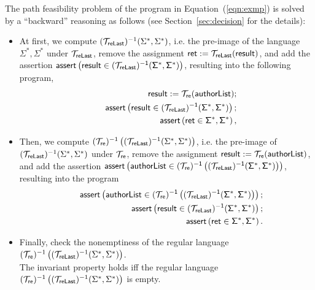 The path feasibility problem of the program in Equation~(\ref{eqn:exmp}) is solved by a ``backward'' reasoning as follows (see Section~\ref{sec:decision} for the details):  
\begin{itemize}
\item At first, we compute $(\mathcal{T}_{\sf reLast})^{-1}(\Sigma^*, \Sigma^*)$,  i.e. the pre-image of the language $\Sigma^*, \Sigma^*$ under $\mathcal{T}_{\sf reLast}$,  remove the assignment $\sf  ret : = \mathcal{T}_{reLast}(result)$, and add the assertion $\textsf{assert}\left(\sf result \in (\mathcal{T}_{\sf reLast})^{-1}(\Sigma^*, \Sigma^*)\right)$, resulting into the following program,
\begin{eqnarray}
& & \sf result  := \sf  \mathcal{T}_{ re}(authorList); \nonumber\\
& & \textsf{assert}\left(\sf result \in (\mathcal{T}_{\sf reLast})^{-1}(\Sigma^*, \Sigma^*)\right); \nonumber\\
& & \sf \textsf{assert}\left(ret \in \Sigma^*, \Sigma^*\right),
\end{eqnarray}

%
\item Then, we compute $(\mathcal{T}_{\sf re})^{-1}\left((\mathcal{T}_{\sf reLast})^{-1}(\Sigma^*, \Sigma^*)\right)$, i.e. the pre-image of $(\mathcal{T}_{\sf reLast})^{-1}(\Sigma^*, \Sigma^*)$ under $\mathcal{T}_{\sf re}$, remove the assignment $ \sf result  := \sf  \mathcal{T}_{ re}(authorList)$, and add the assertion $\textsf{assert}\left(\sf authorList \in (\mathcal{T}_{ re})^{-1}\left((\mathcal{T}_{\sf reLast})^{-1}(\Sigma^*, \Sigma^*)\right)\right)$, resulting into the program 
\begin{eqnarray}\label{eqn:exmp-final}
& & \textsf{assert}\left(\sf authorList \in (\mathcal{T}_{ re})^{-1}\left((\mathcal{T}_{\sf reLast})^{-1}(\Sigma^*, \Sigma^*)\right)\right); \nonumber\\
& & \textsf{assert}\left(\sf result \in (\mathcal{T}_{\sf reLast})^{-1}(\Sigma^*, \Sigma^*)\right); \nonumber\\
& & \sf \textsf{assert}\left(ret \in \Sigma^*, \Sigma^*\right).
\end{eqnarray}
\item Finally, check the nonemptiness of the regular language $(\mathcal{T}_{\sf re})^{-1}\left((\mathcal{T}_{\sf reLast})^{-1}(\Sigma^*, \Sigma^*)\right)$.\\
The invariant property holds iff the regular language $(\mathcal{T}_{\sf re})^{-1}\left((\mathcal{T}_{\sf reLast})^{-1}(\Sigma^*, \Sigma^*)\right)$ is empty.
\end{itemize}

